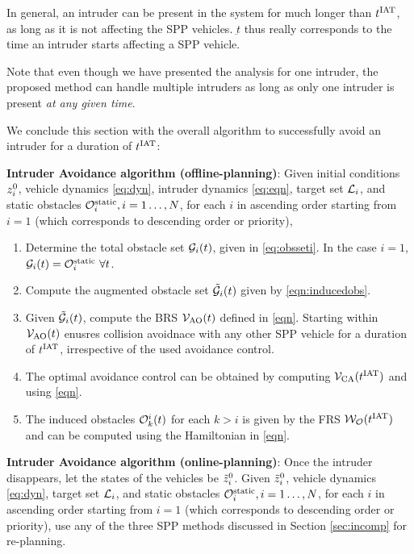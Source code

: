 \begin{remark}
In general, an intruder can be present in the system for much longer than $t^\text{IAT}$, as long as it is not affecting the SPP vehicles. $\underbar{t}$ thus really corresponds to the time an intruder starts affecting a SPP vehicle.
\end{remark}

\begin{remark}
Note that even though we have presented the analysis for one intruder, the proposed method can handle multiple intruders as long as only one intruder is present \textit{at any given time}. 
\end{remark}

We conclude this section with the overall algorithm to successfully avoid an intruder for a duration of $t^\text{IAT}$: 
\begin{alg}
\label{alg:intruder}
\textbf{Intruder Avoidance algorithm (offline-planning)}: Given initial conditions $z_i^0$, vehicle dynamics \eqref{eq:dyn}, intruder dynamics \eqref{eq:eqn}, target set $\mathcal{L}_i$, and static obstacles $\mathcal{O}^\text{static}_i, i = 1\ldots, N$, for each $i$ in ascending order starting from $i=1$ (which corresponds to descending order or priority),
\begin{enumerate}
\item Determine the total obstacle set $\mathcal{G}_i(t)$, given in \eqref{eq:obsseti}. In the case $i=1$, $\mathcal{G}_i(t) = \mathcal{O}^\text{static}_i ~ \forall t$.
\item Compute the augmented obstacle set $\tilde{\mathcal{G}}_i(t)$ given by \eqref{eqn:inducedobs}.
\item Given $\tilde{\mathcal{G}}_i(t)$, compute the BRS $\mathcal{V}_{\text{AO}}(t)$ defined in \eqref{eqn}. Starting within $\mathcal{V}_{\text{AO}}(t)$ enusres collision avoidnace with any other SPP vehicle for a duration of $t^\text{IAT}$, irrespective of the used avoidance control. 
\item The optimal avoidance control can be obtained by computing $\mathcal{V}_{\text{CA}}(t^\text{IAT})$ and using \eqref{eqn}. 
\item The induced obstacles $\mathcal{O}_k^i(t)$ for each $k>i$ is given by the FRS $\mathcal{W}_{\mathcal{O}}(t^\text{IAT})$ and can be computed using the Hamiltonian in \eqref{eqn}.
\end{enumerate}

\textbf{Intruder Avoidance algorithm (online-planning)}: Once the intruder disappears, let the states of the vehicles be $\tilde{z}_i^0$. Given $\tilde{z}_i^0$, vehicle dynamics \eqref{eq:dyn}, target set $\mathcal{L}_i$, and static obstacles $\mathcal{O}^\text{static}_i, i = 1\ldots, N$, for each $i$ in ascending order starting from $i=1$ (which corresponds to descending order or priority), use any of the three SPP methods discussed in Section \ref{sec:incomp} for re-planning. 
\end{alg}